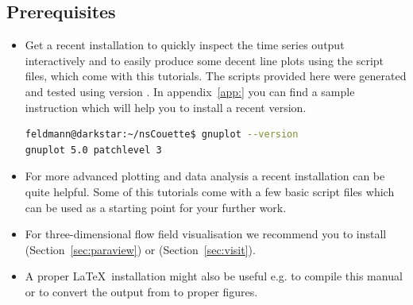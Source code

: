 \documentclass[a4paper, 11pt, DIV=11]{scrartcl}
\begin{document}
\subsection{Prerequisites}
\begin{itemize}
\item
Get a recent  installation to quickly inspect the time series output
interactively and to easily produce some decent line plots using the 
script files, which come with this tutorials. The scripts provided here were
generated and tested using version . In appendix~\ref{app:}
you can find a sample instruction which will help you to install a recent version.
\begin{lstlisting}[language=bash]
feldmann@darkstar:~/nsCouette$ gnuplot --version
gnuplot 5.0 patchlevel 3
\end{lstlisting}
\item
For more advanced plotting and data analysis a recent  installation can be
quite helpful. Some of this tutorials come with a few basic  script files
which can be used as a starting point for your further work.
\item
For three-dimensional flow field visualisation we recommend you to install 
(Section~\ref{sec:paraview}) or  (Section~\ref{sec:visit}).
\item
A proper \LaTeX~installation might also be useful e.g. to compile this manual or to convert
the  output from  to proper  figures.
\end{itemize}
\end{document}
